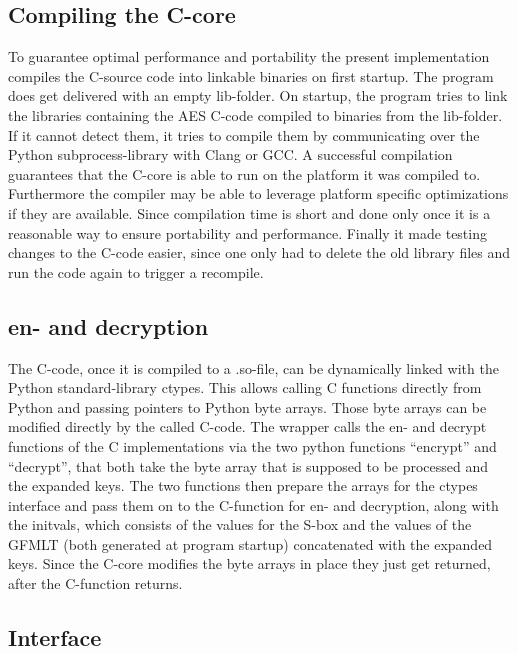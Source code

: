 \hypertarget{compiling-the-c-core}{%
\subsection{Compiling the C-core}\label{compiling-the-c-core}}

To guarantee optimal performance and portability the present
implementation compiles the C-source code into linkable binaries on
first startup. The program does get delivered with an empty lib-folder.
On startup, the program tries to link the libraries containing the AES
C-code compiled to binaries from the lib-folder. If it cannot detect
them, it tries to compile them by communicating over the Python
subprocess-library with Clang or GCC. A successful compilation
guarantees that the C-core is able to run on the platform it was
compiled to. Furthermore the compiler may be able to leverage platform
specific optimizations if they are available. Since compilation time is
short and done only once it is a reasonable way to ensure portability
and performance. Finally it made testing changes to the C-code easier,
since one only had to delete the old library files and run the code
again to trigger a recompile.

\hypertarget{en--and-decryption}{%
\subsection{en- and decryption}\label{en--and-decryption}}

The C-code, once it is compiled to a .so-file, can be dynamically linked
with the Python standard-library ctypes. This allows calling C functions
directly from Python and passing pointers to Python byte arrays. Those
byte arrays can be modified directly by the called C-code. The wrapper
calls the en- and decrypt functions of the C implementations via the two
python functions ``encrypt'' and ``decrypt'', that both take the byte
array that is supposed to be processed and the expanded keys. The two
functions then prepare the arrays for the ctypes interface and pass them
on to the C-function for en- and decryption, along with the initvals,
which consists of the values for the S-box and the values of the GFMLT
(both generated at program startup) concatenated with the expanded keys.
Since the C-core modifies the byte arrays in place they just get
returned, after the C-function returns.

\hypertarget{interface}{%
\subsection{Interface}\label{interface}}

